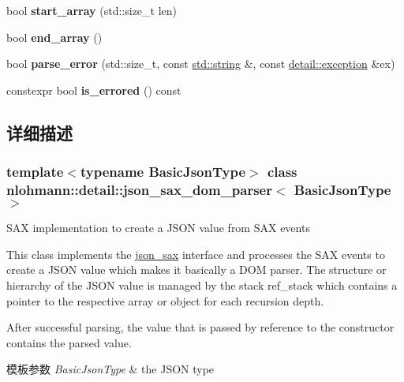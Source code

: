 \begin{DoxyCompactItemize}
bool {\bfseries start\+\_\+array} (std\+::size\+\_\+t len)
\item 
\mbox{\label{classnlohmann_1_1detail_1_1json__sax__dom__parser_af7cb5e5fe06ea908b0ce4ed762919759}} 
bool {\bfseries end\+\_\+array} ()
\item 
\mbox{\label{classnlohmann_1_1detail_1_1json__sax__dom__parser_a7d3bf1f361ebb817c694ba45b3814fa6}} 
bool {\bfseries parse\+\_\+error} (std\+::size\+\_\+t, const \mbox{\hyperlink{namespacenlohmann_1_1detail_a1ed8fc6239da25abcaf681d30ace4985ab45cffe084dd3d20d928bee85e7b0f21}{std\+::string}} \&, const \mbox{\hyperlink{classnlohmann_1_1detail_1_1exception}{detail\+::exception}} \&ex)
\item 
\mbox{\label{classnlohmann_1_1detail_1_1json__sax__dom__parser_ad1b9f3681fadbbb2e0127f5c8a99c662}} 
constexpr bool {\bfseries is\+\_\+errored} () const
\end{DoxyCompactItemize}


\subsection{详细描述}
\subsubsection*{template$<$typename Basic\+Json\+Type$>$\newline
class nlohmann\+::detail\+::json\+\_\+sax\+\_\+dom\+\_\+parser$<$ Basic\+Json\+Type $>$}

S\+AX implementation to create a J\+S\+ON value from S\+AX events 

This class implements the \mbox{\hyperlink{structnlohmann_1_1json__sax}{json\+\_\+sax}} interface and processes the S\+AX events to create a J\+S\+ON value which makes it basically a D\+OM parser. The structure or hierarchy of the J\+S\+ON value is managed by the stack {\ttfamily ref\+\_\+stack} which contains a pointer to the respective array or object for each recursion depth.

After successful parsing, the value that is passed by reference to the constructor contains the parsed value.


\begin{DoxyTemplParams}{模板参数}
{\em Basic\+Json\+Type} & the J\+S\+ON type \\
\hline
\end{DoxyTemplParams}


